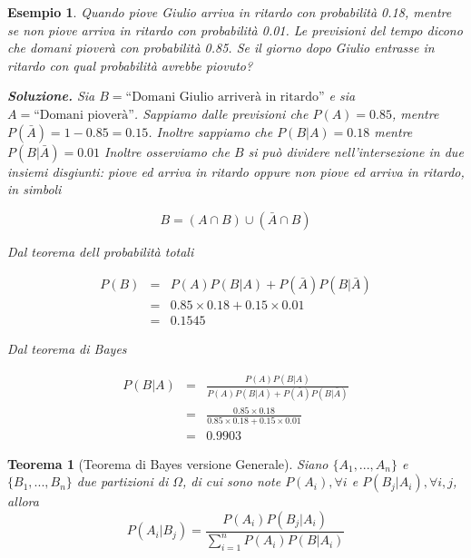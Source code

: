 \documentclass[
  11pt,
]{book}
\theoremstyle{mytheoremstyle}
\newtheorem{theorem}{Teorema}[section]
\theoremstyle{mydefstyle}
\newtheorem{example}{{Esempio}}[section]
\begin{document}
\begin{example}
Quando piove Giulio arriva in ritardo con probabilità 0.18, mentre se
non piove arriva in ritardo con probabilità 0.01. Le previsioni del
tempo dicono che domani pioverà con probabilità 0.85. Se il giorno dopo
Giulio entrasse in ritardo con qual probabilità avrebbe piovuto?

\textbf{Soluzione.} Sia \(B=\text{“Domani Giulio arriverà in ritardo''}\) e sia
\(A=\text{“Domani pioverà''}\). Sappiamo dalle previsioni che \(P(A)=0.85\),
mentre \(P(\bar A)=1-0.85=0.15\). Inoltre sappiamo che \(P(B|A)=0.18\)
mentre \(P(B|\bar A)=0.01\) Inoltre osserviamo che \(B\) si può dividere
nell'intersezione in due insiemi disgiunti: piove \emph{ed} arriva in ritardo
\emph{oppure} non piove \emph{ed} arriva in ritardo, in simboli

\[
B = (A\cap B) \cup (\bar A \cap B)
\]

Dal teorema dell probabilità totali

\begin{eqnarray*}
P(B)&=&P(A)P(B|A)+P(\bar A)P(B|\bar A)\\
&=& 0.85\times 0.18 + 0.15\times 0.01\\
&=& 0.1545
\end{eqnarray*}

Dal teorema di Bayes

\begin{eqnarray*}
P(B|A)&=&\frac{P(A)P(B|A)}{P(A)P(B|A)+P(\bar A)P(B|\bar A)}\\
&=& \frac{0.85\times 0.18}{0.85\times 0.18 + 0.15\times 0.01}\\
&=& 0.9903
\end{eqnarray*}
\end{example}

\begin{info}

\begin{theorem}[Teorema di Bayes versione Generale]
Siano \(\{A_1,...,A_n\}\) e \(\{B_1,...,B_n\}\) due partizioni di \(\Omega\),
di cui sono note \(P(A_i), \forall i\) e \(P(B_j|A_i), \forall i,j\), allora
\[
P(A_i|B_j)=\frac{P(A_i)P(B_j|A_i)} {\sum_{i=1}^nP(A_i)P(B|A_i)}
\]
\end{theorem}

\end{info}
\end{document}
